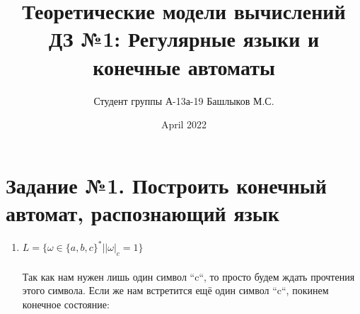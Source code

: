 \documentclass{article}
\title{Теоретические модели вычислений \\ ДЗ №1: Регулярные языки и конечные автоматы}
\author{Студент группы А-13а-19 Башлыков М.С.}
\date{April 2022}
\begin{document}
\maketitle
\newpage
{}

\section{Задание №1. Построить конечный автомат,
распознающий язык}
\begin{enumerate}
    \item \(L = \{\omega \in \{a,b,c\}^* | |\omega|_c = 1 \} \) \\ \\
        Так как нам нужен лишь один символ ``c``, то просто будем ждать прочтения этого символа. Если же нам встретится ещё один символ ``c``, покинем конечное состояние:
    \begin{center}
    \end{center}
    

\end{enumerate}
\end{document}
